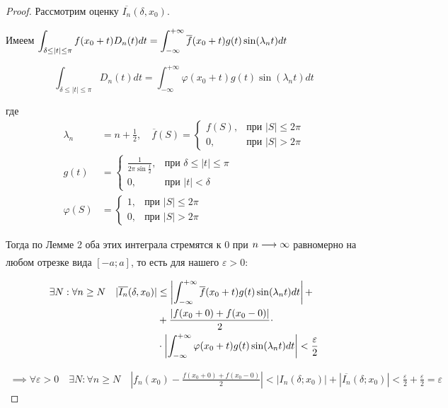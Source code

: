 \begin{proof}
    Рассмотрим оценку $\overline{I_n}(\delta, x_0)$.

    Имеем $\displaystyle\int_{\delta \leq |t| \leq \pi} f(x_0 + t) D_n(t) dt =
    \displaystyle\int_{-\infty}^{+\infty} \overline{f}(x_0 + t) g(t) \sin(\lambda_n t) dt$

    \[ 
        \int_{\delta \leq |t| \leq \pi} D_n(t) dt =
        \int_{-\infty}^{+\infty} \varphi(x_0 + t) g(t) \sin (\lambda_n t) dt
    \]

    где
    \begin{align*}
        \lambda_n &= n + \frac{1}{2}, \quad \overline{f}(S) = \begin{cases}
            f(S), &\text{при } |S| \leq 2\pi \\
            0, &\text{при } |S| > 2\pi
        \end{cases} \\
        g(t) &= \begin{cases}
            \frac{1}{2\pi \sin \frac{t}{2}}, &\text{при } \delta \leq |t| \leq \pi \\
            0, &\text{при } |t| < \delta
        \end{cases} \\
        \varphi(S) &= \begin{cases}
            1, &\text{при } |S| \leq 2\pi \\
            0, &\text{при } |S| > 2\pi
        \end{cases}
    \end{align*}

    Тогда по Лемме 2 оба этих интеграла стремятся к 0 при $n \underset{}{\longrightarrow} \infty$
    равномерно на любом отрезке вида $[-a; a]$, то есть для нашего $\varepsilon > 0$:

    \begin{align*}
        \exists N : \forall n \geq N \quad |\overline{I_n}(\delta, x_0)| &\leq
        \left| \displaystyle\int_{-\infty}^{+\infty} \overline{f}(x_0 + t) g(t) \sin(\lambda_n t) dt \right| + \\
        &+ \frac{|f(x_0 + 0) + f(x_0 - 0)|}{2} \cdot \\ &\cdot \left|
            \int_{-\infty}^{+\infty} \varphi(x_0 + t) g(t) \sin (\lambda_n t) dt
        \right| < \frac{\varepsilon}{2}
    \end{align*}

    \begin{align*}
        \implies \forall \varepsilon > 0 \quad \exists N : \forall n \geq N \quad
        \left| f_n(x_0) - \frac{f(x_0 + 0) + f(x_0 - 0)}{2} \right| <
        |I_n(\delta; x_0)| + |\overline{I_n}(\delta; x_0)| <
        \frac{\varepsilon}{2} + \frac{\varepsilon}{2} = \varepsilon
    \end{align*}


\end{proof}
